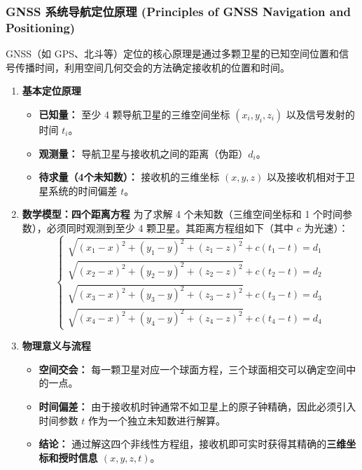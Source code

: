 \documentclass[12pt,a4paper]{article}
\begin{document}
	\subsubsection{GNSS 系统导航定位原理 (Principles of GNSS Navigation and Positioning)}
	
	GNSS（如 GPS、北斗等）定位的核心原理是通过多颗卫星的已知空间位置和信号传播时间，利用空间几何交会的方法确定接收机的位置和时间。
	
	\begin{enumerate}
		\item \textbf{基本定位原理}
		\begin{itemize}
			\item \textbf{已知量：} 至少 4 颗导航卫星的三维空间坐标 $(x_i, y_i, z_i)$ 以及信号发射的时间 $t_i$。
			\item \textbf{观测量：} 导航卫星与接收机之间的距离（伪距）$d_i$。
			\item \textbf{待求量（4个未知数）：} 接收机的三维坐标 $(x, y, z)$ 以及接收机相对于卫星系统的时间偏差 $t$。
		\end{itemize}
		
		\item \textbf{数学模型：四个距离方程}
		为了求解 4 个未知数（三维空间坐标和 1 个时间参数），必须同时观测到至少 4 颗卫星。其距离方程组如下（其中 $c$ 为光速）：
		\[
			\begin{cases}
				\sqrt{(x_1 - x)^2 + (y_1 - y)^2 + (z_1 - z)^2} + c(t_1 - t) = d_1 \\
				\sqrt{(x_2 - x)^2 + (y_2 - y)^2 + (z_2 - z)^2} + c(t_2 - t) = d_2 \\
				\sqrt{(x_3 - x)^2 + (y_3 - y)^2 + (z_3 - z)^2} + c(t_3 - t) = d_3 \\
				\sqrt{(x_4 - x)^2 + (y_4 - y)^2 + (z_4 - z)^2} + c(t_4 - t) = d_4
			\end{cases}
		\]
		
		\item \textbf{物理意义与流程}
		\begin{itemize}
			\item \textbf{空间交会：} 每一颗卫星对应一个球面方程，三个球面相交可以确定空间中的一点。
			\item \textbf{时间偏差：} 由于接收机时钟通常不如卫星上的原子钟精确，因此必须引入时间参数 $t$ 作为一个独立未知数进行解算。
			\item \textbf{结论：} 通过解这四个非线性方程组，接收机即可实时获得其精确的\textbf{三维坐标和授时信息 $(x, y, z, t)$}。
		\end{itemize}
	\end{enumerate}
\end{document}
